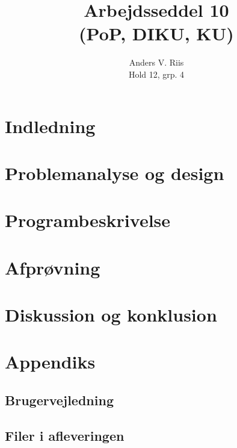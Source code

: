 \documentclass{pop}
\author{Anders V. Riis \\ Hold 12, grp. 4}
\title{Arbejdsseddel 10 \\(PoP, DIKU, KU)}
\begin{document}
\maketitle
\section{Indledning}
\section{Problemanalyse og design}
\section{Programbeskrivelse}
\section{Afprøvning}
\section{Diskussion og konklusion}
\newpage
\section*{Appendiks}
\subsection*{Brugervejledning}
\subsection*{Filer i afleveringen}
\end{document}
